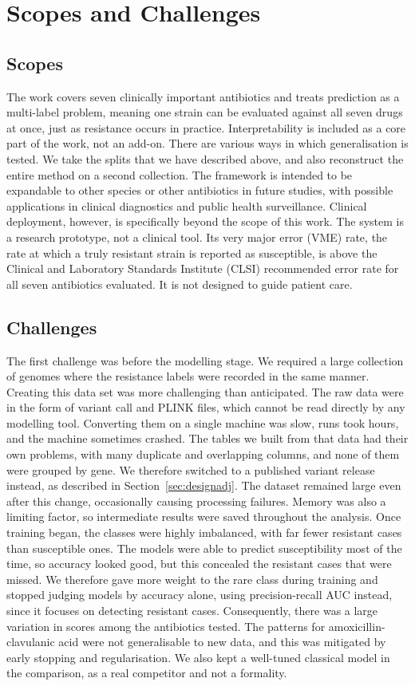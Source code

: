 \section{Scopes and Challenges}

\subsection{Scopes}
The work covers seven clinically important antibiotics and treats prediction as a multi-label problem, meaning one strain can be evaluated against all seven drugs at once, just as resistance occurs in practice. Interpretability is included as a core part of the work, not an add-on. There are various ways in which generalisation is tested. We take the splits that we have described above, and also reconstruct the entire method on a second collection. The framework is intended to be expandable to other species or other antibiotics in future studies, with possible applications in clinical diagnostics and public health surveillance. Clinical deployment, however, is specifically beyond the scope of this work. The system is a research prototype, not a clinical tool. Its very major error (VME) rate, the rate at which a truly resistant strain is reported as susceptible, is above the Clinical and Laboratory Standards Institute (CLSI) recommended error rate for all seven antibiotics evaluated. It is not designed to guide patient care.

\subsection{Challenges}
The first challenge was before the modelling stage. We required a large collection of genomes where the resistance labels were recorded in the same manner. Creating this data set was more challenging than anticipated. The raw data were in the form of variant call and PLINK files, which cannot be read directly by any modelling tool. Converting them on a single machine was slow, runs took hours, and the machine sometimes crashed. The tables we built from that data had their own problems, with many duplicate and overlapping columns, and none of them were grouped by gene. We therefore switched to a published variant release instead, as described in Section~\ref{sec:designadj}. The dataset remained large even after this change, occasionally causing processing failures. Memory was also a limiting factor, so intermediate results were saved throughout the analysis. Once training began, the classes were highly imbalanced, with far fewer resistant cases than susceptible ones. The models were able to predict susceptibility most of the time, so accuracy looked good, but this concealed the resistant cases that were missed. We therefore gave more weight to the rare class during training and stopped judging models by accuracy alone, using precision-recall AUC instead, since it focuses on detecting resistant cases. Consequently, there was a large variation in scores among the antibiotics tested. The patterns for amoxicillin-clavulanic acid were not generalisable to new data, and this was mitigated by early stopping and regularisation. We also kept a well-tuned classical model in the comparison, as a real competitor and not a formality.

